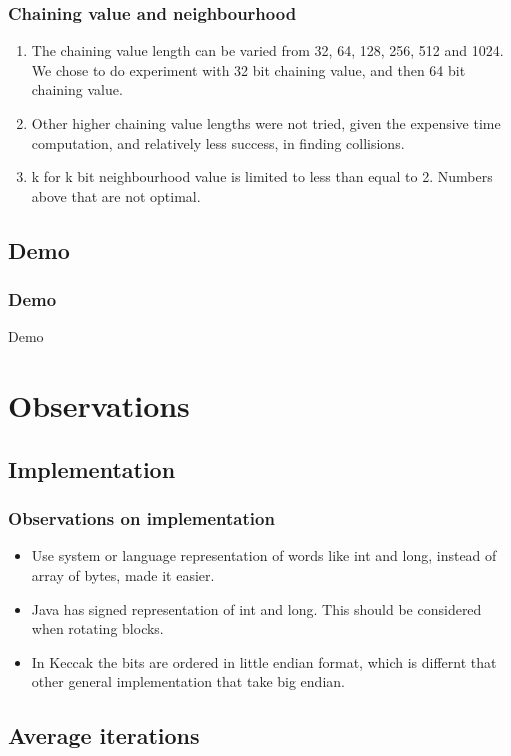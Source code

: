 \documentclass{beamer}
\begin{document}
\begin{frame}
\frametitle{Chaining value and neighbourhood}
\begin{enumerate}
\item The chaining value length can be varied from 32, 64, 128, 256, 512 and 1024. We chose to do experiment
with 32 bit chaining value, and then 64 bit chaining value.
\item Other higher chaining value lengths were not tried, given the expensive time computation, and relatively
less success, in finding collisions.
\item k for k bit neighbourhood value is limited to less than equal to 2. Numbers above that are not optimal. 
\end{enumerate}
\end{frame}

\subsection{Demo}
\begin{frame}
\frametitle{Demo}
Demo
\end{frame}

\section{Observations}

\subsection{Implementation}

\begin{frame}
\frametitle{Observations on implementation}
\begin{itemize}
\item Use system or language representation of words like int and long, instead of array of bytes, made
it easier.
\item Java has signed representation of int and long. This should be considered when rotating blocks.
\item In Keccak the bits are ordered in little endian format, which is differnt that other general
implementation that take big endian.
\end{itemize}
\end{frame}

\subsection{Average iterations}
\end{document}
